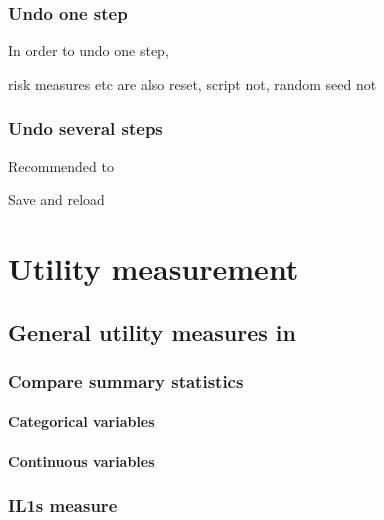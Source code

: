 \documentclass[letterpaper,10pt,english]{sphinxmanual}
\begin{document}
\subsection{Undo one step}
\label{\detokenize{anon:undo-one-step}}
In order to undo one step,

risk measures etc are also reset, script not, random seed not


\subsection{Undo several steps}
\label{\detokenize{anon:undo-several-steps}}
Recommended to

Save and reload


\chapter{Utility measurement}
\label{\detokenize{utility:utility-measurement}}\label{\detokenize{utility::doc}}

\section{General utility measures in }
\label{\detokenize{utility:general-utility-measures-in-sdcapp}}

\subsection{Compare summary statistics}
\label{\detokenize{utility:compare-summary-statistics}}

\subsubsection{Categorical variables}
\label{\detokenize{utility:categorical-variables}}

\subsubsection{Continuous variables}
\label{\detokenize{utility:continuous-variables}}

\subsection{IL1s measure}
\label{\detokenize{utility:il1s-measure}}
\end{document}
